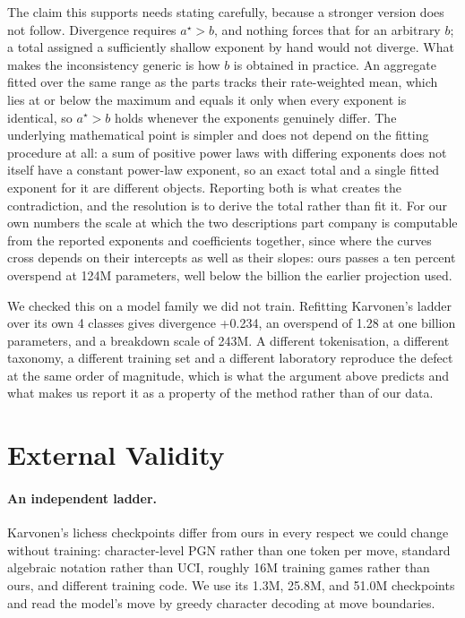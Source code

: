 \documentclass[11pt]{article}
\begin{document}
The claim this supports needs stating carefully, because a stronger version does not
follow. Divergence requires $a^\star > b$, and nothing forces that for an arbitrary
$b$; a total assigned a sufficiently shallow exponent by hand would not diverge. What
makes the inconsistency generic is how $b$ is obtained in practice. An aggregate
fitted over the same range as the parts tracks their rate-weighted mean, which lies at
or below the maximum and equals it only when every exponent is identical, so
$a^\star > b$ holds whenever the exponents genuinely differ. The underlying
mathematical point is simpler and does not depend on the fitting procedure at all: a
sum of positive power laws with differing exponents does not itself have a constant
power-law exponent, so an exact total and a single fitted exponent for it are
different objects. Reporting both is what creates the contradiction, and the
resolution is to derive the total rather than fit it. For our own numbers the scale at
which the two descriptions part company is computable from
the reported exponents and coefficients together, since where the curves cross depends
on their intercepts as well as their slopes: ours passes a ten percent overspend at
124M parameters, well below the billion the earlier projection
used.

We checked this on a model family we did not train. Refitting Karvonen's ladder
over its own 4 classes gives divergence +0.234,
an overspend of 1.28 at one billion parameters, and a breakdown
scale of 243M. A different tokenisation, a different taxonomy,
a different training set and a different laboratory reproduce the defect at the
same order of magnitude, which is what the argument above predicts and what makes
us report it as a property of the method rather than of our data.

\section{External Validity}
\label{sec:external}

\paragraph{An independent ladder.}
Karvonen's lichess checkpoints \citep{karvonen2024emergent} differ from ours in
every respect we could change without training: character-level PGN rather than
one token per move, standard algebraic notation rather than UCI, roughly 16M
training games rather than ours, and different training code. We use its
1.3M, 25.8M, and 51.0M checkpoints
and read the model's move by greedy character decoding at move boundaries.
\end{document}
